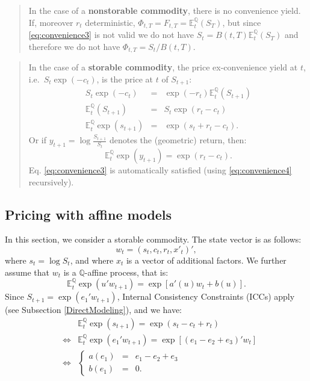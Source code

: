 \documentclass[
  12pt,
]{book}
\theoremstyle{definition}
\theoremstyle{definition}
\theoremstyle{definition}
\theoremstyle{definition}
\theoremstyle{remark}
\begin{document}
\begin{quote}
In the case of a \textbf{nonstorable commodity}, there is no convenience yield. If, moreover \(r_t\) deterministic, \(\Phi_{t,T} = F_{t,T} = \mathbb{E}^{\mathbb{Q}}_t (S_T)\), but since \eqref{eq:convenience3} is not valid we do not have \(S_t = B(t,T) \mathbb{E}^{\mathbb{Q}}_t (S_T)\) and therefore we do not have \(\Phi_{t,T} = S_t / B(t,T)\).
\end{quote}

\begin{quote}
In the case of a \textbf{storable commodity}, the price ex-convenience yield at \(t\), i.e.~\(S_t \exp (-c_t)\), is the price at \(t\) of \(S_{t+1}\):
\begin{eqnarray}
S_t \exp (-c_t) &=& \exp (-r_t) \mathbb{E}^{\mathbb{Q}}_t (S_{t+1}) \nonumber\\
\mathbb{E}^{\mathbb{Q}}_t (S_{t+1}) & = & S_t \exp (r_t - c_t) \label{eq:convenience4} \\
\mathbb{E}^{\mathbb{Q}}_t \exp (s_{t+1}) &=& \exp(s_t+r_t-c_t). \nonumber
\end{eqnarray}
Or if \(y_{t+1} = \log \frac{S_{t+1}}{S_t}\) denotes the (geometric) return, then:
\[
\mathbb{E}^{\mathbb{Q}}_t \exp (y_{t+1}) = \exp (r_t - c_t).
\]
Eq. \eqref{eq:convenience3} is automatically satisfied (using \eqref{eq:convenience4} recursively).
\end{quote}

\hypertarget{FCFPPricingRN}{%
\subsection{Pricing with affine models}\label{FCFPPricingRN}}

In this section, we consider a storable commodity. The state vector is as follows:
\[
w_t = (s_t, c_t, r_t, x'_t)',
\]
where \(s_t = \log S_t\), and where \(x_t\) is a vector of additional factors. We further assume that \(w_t\) is a \(\mathbb{Q}\)-affine process, that is:
\[
\mathbb{E}^{\mathbb{Q}}_t \exp (u' w_{t+1}) = \exp [a' (u) w_t + b(u)].
\]
Since \(S_{t+1} = \exp (e_1' w_{t+1})\), Internal Consistency Constraints (ICCs) apply (see Subsection \ref{DirectModeling}), and we have:
\begin{eqnarray*}
&&\mathbb{E}^{\mathbb{Q}}_t \exp (s_{t+1}) = \exp (s_t-c_t+r_t)\\
&\Leftrightarrow& \mathbb{E}^{\mathbb{Q}}_t \exp (e_1' w_{t+1}) = \exp [(e_1 - e_2 + e_3)' w_t]\\
&\Leftrightarrow& \left\{\begin{array}{lcl}
a(e_1) &=& e_1 - e_2 + e_3 \\
b(e_1) &=&0.
\end{array} \right.
\end{eqnarray*}
\end{document}
